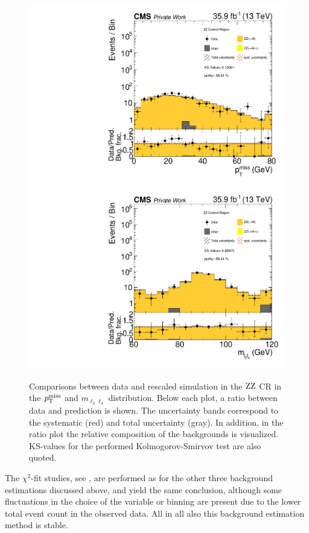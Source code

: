 \begin{figure}[tbp]
 \centering
 \includegraphics[width=\pairwidth]{figures/plots_CR_zz/CRZZ_LL_nom_met_log}
 \includegraphics[width=\pairwidth]{figures/plots_CR_zz/CRZZ_LL_nom_m_ll2_log}
 \caption{Comparisons between data and rescaled simulation in the $\mathrm{Z}\mathrm{Z}$ CR in the $p_{\mathrm{T}}^\text{miss}$ and $m_{\ell_3\ell_4}$ distribution. Below each plot, a ratio between data and prediction is shown. The uncertainty bands correspond to the systematic (red) and total uncertainty (gray). In addition, in the ratio plot the relative composition of the backgrounds is visualized. KS-values for the performed Kolmogorov-Smirvov test are also quoted.}
 \label{fig:CRZZ}
\end{figure}
The $\chi^2$-fit studies, see , are performed as for the other three background estimations discussed above, and yield the same conclusion, although some fluctuations in the choice of the variable or binning are present due to the lower total event count in the observed data. All in all also this background estimation method is stable.
